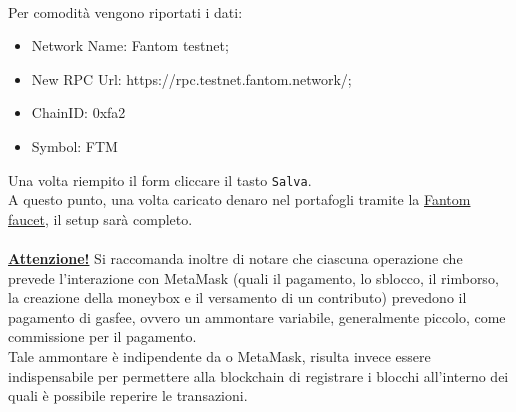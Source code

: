 \textbf{}\\
Per comodità vengono riportati i dati:
\begin{itemize}
    \item Network Name: Fantom testnet;
    \item New RPC Url: https://rpc.testnet.fantom.network/;
    \item ChainID: 0xfa2
    \item Symbol: FTM
\end{itemize}
Una volta riempito il form cliccare il tasto \texttt{Salva}.\\
A questo punto, una volta caricato denaro nel portafogli tramite la \href{https://faucet.fantom.network/}{Fantom faucet}, il setup sarà completo.\\\\
\underline{\textbf{Attenzione!}} Si raccomanda inoltre di notare che ciascuna operazione che prevede l'interazione con MetaMask (quali il pagamento, lo sblocco, il rimborso, la creazione della moneybox e il versamento di un contributo) prevedono il pagamento di gasfee, ovvero un ammontare variabile, generalmente piccolo, come commissione per il pagamento.\\
Tale ammontare è indipendente da \projectName{} o MetaMask, risulta invece essere indispensabile per permettere alla blockchain di registrare i blocchi all'interno dei quali è possibile reperire le transazioni.
